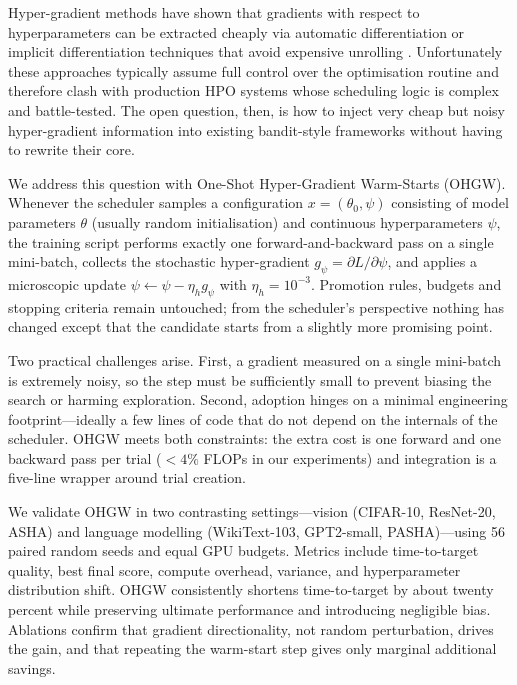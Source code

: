 \documentclass{article}
\begin{document}
Hyper-gradient methods have shown that gradients with respect to hyperparameters can be extracted cheaply via automatic differentiation \cite{chandra-2019-gradient} or implicit differentiation techniques that avoid expensive unrolling \cite{bertrand-2020-implicit}. Unfortunately these approaches typically assume full control over the optimisation routine and therefore clash with production HPO systems whose scheduling logic is complex and battle-tested. The open question, then, is how to inject very cheap but noisy hyper-gradient information into existing bandit-style frameworks without having to rewrite their core.

We address this question with One-Shot Hyper-Gradient Warm-Starts (OHGW). Whenever the scheduler samples a configuration $x=(\theta_0,\psi)$ consisting of model parameters $\theta$ (usually random initialisation) and continuous hyperparameters $\psi$, the training script performs exactly one forward-and-backward pass on a single mini-batch, collects the stochastic hyper-gradient $g_{\psi}=\partial L/\partial \psi$, and applies a microscopic update $\psi \leftarrow \psi - \eta_h g_{\psi}$ with $\eta_h = 10^{-3}$. Promotion rules, budgets and stopping criteria remain untouched; from the scheduler's perspective nothing has changed except that the candidate starts from a slightly more promising point.

Two practical challenges arise. First, a gradient measured on a single mini-batch is extremely noisy, so the step must be sufficiently small to prevent biasing the search or harming exploration. Second, adoption hinges on a minimal engineering footprint—ideally a few lines of code that do not depend on the internals of the scheduler. OHGW meets both constraints: the extra cost is one forward and one backward pass per trial ($<\!4\%$ FLOPs in our experiments) and integration is a five-line wrapper around trial creation.

We validate OHGW in two contrasting settings—vision (CIFAR-10, ResNet-20, ASHA) and language modelling (WikiText-103, GPT2-small, PASHA)—using 56 paired random seeds and equal GPU budgets. Metrics include time-to-target quality, best final score, compute overhead, variance, and hyperparameter distribution shift. OHGW consistently shortens time-to-target by about twenty percent while preserving ultimate performance and introducing negligible bias. Ablations confirm that gradient directionality, not random perturbation, drives the gain, and that repeating the warm-start step gives only marginal additional savings.
\end{document}
